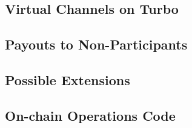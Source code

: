 \documentclass{article}
\begin{document}
\subsection{Virtual Channels on Turbo}
\subsection{Payouts to Non-Participants}
\subsection{Possible Extensions}

\subsection{On-chain Operations Code}
\end{document}
